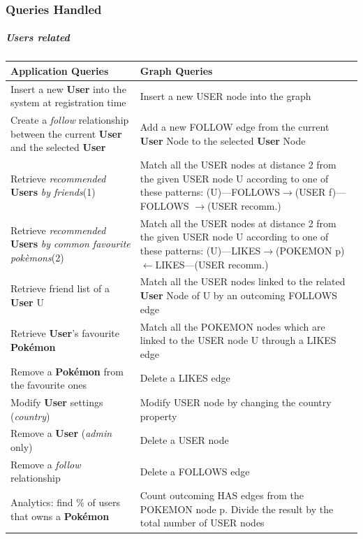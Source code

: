 \subsubsection{Queries Handled}
\subparagraph{Users related}
\begingroup
\setlength{\tabcolsep}{10pt} %
\renewcommand{\arraystretch}{1.5} %
\begin{center}
	\begin{longtable}{|m{}| m{} |} 
		\hline
		\textbf{Application Queries} & \textbf{Graph Queries} \\ [0.5ex] 
		\hline
		Insert a new \textbf{User} into the system at registration time 		
		& Insert a new USER node into the graph\\ 
		\hline
		Create a \textit{follow} relationship between the current \textbf{User} and the selected \textbf{User}		
		& Add a new FOLLOW edge from the current \textbf{User} Node to the selected \textbf{User} Node \\ 
		\hline
		Retrieve \textit{recommended} \textbf{Users} \textit{by friends}(1)
		& Match all the USER nodes at distance 2 from the given USER node U according to one of these patterns:
		(U)—FOLLOWS$\rightarrow$(USER f)—FOLLOWS $\rightarrow$(USER recomm.)\\
		\hline
		Retrieve \textit{recommended} \textbf{Users} \textit{by common favourite pokèmons}(2)
		& Match all the USER nodes at distance 2 from the given USER node U according to one of these patterns:
		(U)—LIKES$\rightarrow$(POKEMON p)$\leftarrow$LIKES—(USER recomm.)\\
		\hline
		Retrieve friend list of a \textbf{User} U
		& Match all the USER nodes linked to the related \textbf{User} Node of U by an outcoming FOLLOWS edge\\
		\hline	
		Retrieve \textbf{User}’s favourite \textbf{Pokémon} 
		& Match all the POKEMON nodes which are linked to the USER node U through a LIKES edge\\
		\hline	
		Remove a \textbf{Pokémon} from the favourite ones
		& Delete a LIKES edge\\
		\hline
		Modify \textbf{User} settings (\textit{country})
		& Modify USER node by changing the country property\\
		\hline	
		Remove a \textbf{User} (\textit{admin} only)
		& Delete a USER node\\
		\hline		
		Remove a \textit{follow} relationship
		& Delete a FOLLOWS edge\\
		\hline
		Analytics: find $\%$ of users that owns a \textbf{Pokémon}
		& Count outcoming HAS edges from the POKEMON node p. 
		Divide the result by the total number of USER nodes\\
		\hline
	\end{longtable}
\end{center}
